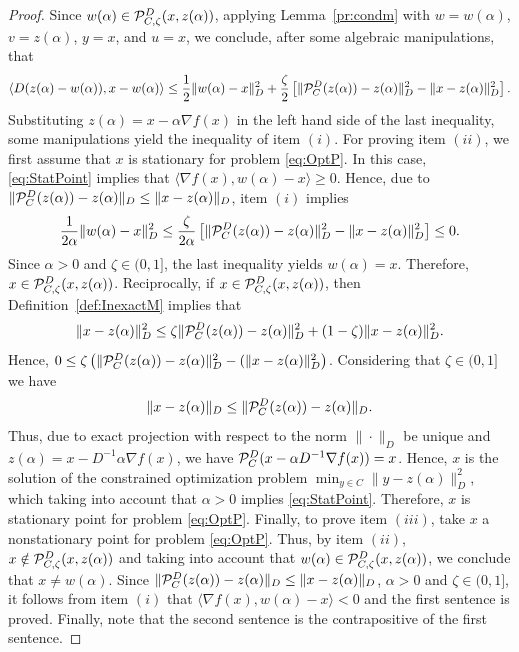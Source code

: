 \begin{proof}
	Since $w(\alpha) \in  {\cal P}_{C,\zeta}^{D}(x, z(\alpha))$, applying Lemma~\ref{pr:condm} with   $w=w(\alpha)$, $v=z(\alpha)$, $y=x$,  and $u=x$, we conclude,  after some algebraic manipulations,  that
	$$
		\left\langle D(z(\alpha)-w(\alpha)), x-w(\alpha) \right\rangle \leq 	\frac{1}{2} \|w(\alpha) -x\|_{D}^2 +   \frac{\zeta}{2} \left[\| {\cal P}_{C}^{D}(z(\alpha))-z(\alpha)\|_{D}^2 - \|x-z(\alpha)\|_{D}^2\right].
	$$
	Substituting  $z(\alpha) = x-\alpha \nabla f(x)$ in the left hand side of the last inequality,   some manipulations yield the inequality of item $(i)$.  For proving item $(ii)$, we first assume that $x$ is stationary for problem \eqref{eq:OptP}. In this case, \eqref{eq:StatPoint} implies that $\langle \nabla f(x), w(\alpha)-x \rangle \geq 0$. Hence,  due to $\|{\cal P}_{C}^{D}(z(\alpha))-z(\alpha)\|_{D}\leq  \|x-z(\alpha)\|_{D}$,   item $(i)$ implies
	$$
		\frac{1}{2\alpha} \|w(\alpha) -x\|_{D}^2 \leq    \frac{\zeta}{2\alpha} \left[\| {\cal P}_{C}^{D}(z(\alpha))-z(\alpha)\|_{D}^2 - \|x-z(\alpha)\|_{D}^2\right]\leq 0.
	$$
	Since $\alpha > 0$ and  $\zeta\in (0, 1]$, the last inequality  yields  $w(\alpha) = x$.  Therefore, $x \in {\cal P}_{C,\zeta}^{D}(x, z(\alpha))$. Reciprocally, if  $x \in {\cal P}_{C,\zeta}^{D}(x, z(\alpha))$, then Definition~\ref{def:InexactM} implies that
	$$
		\|x-z(\alpha)\|_{D}^2\leq \zeta \| {\cal P}_{C}^{D}(z(\alpha))-z(\alpha)\|_{D}^2+(1-\zeta)\|x-z(\alpha)\|_{D}^2.
	$$
	Hence, $0\leq \zeta\left( \| {\cal P}_{C}^{D}(z(\alpha))-z(\alpha)\|_{D}^2-(\|x-z(\alpha)\|_{D}^2\right)$. Considering that  $\zeta\in (0, 1]$ we have
	$$
		\|x-z(\alpha)\|_{D}\leq\| {\cal P}_{C}^{D}(z(\alpha))-z(\alpha)\|_{D}.
	$$
	Thus, due to  exact projection  with respect to the norm $\| \cdot \| _{D}$   be unique and $z(\alpha) = x-D^{-1} \alpha \nabla f(x)$,   we have    ${\cal P}_{C}^{D}( x-\alpha D^{-1} \nabla f(x))=x$. Hence, $x$ is the  solution of the constrained optimization problem $  \min _{y\in C}  \|y-z(\alpha)\| ^{2}_{D}$,
	which taking into account that  $\alpha > 0$ implies \eqref{eq:StatPoint}. Therefore, $x$ is stationary point for problem \eqref{eq:OptP}. Finally, to prove item $(iii)$, take $x$ a nonstationary point for problem \eqref{eq:OptP}. Thus, by item $(ii)$, $x \notin  {\cal P}_{C,\zeta}^{D}(x, z(\alpha))$ and taking into account that $w(\alpha) \in  {\cal P}_{C,\zeta}^{D}(x, z(\alpha))$, we conclude that $x \neq w(\alpha)$. Since $\|{\cal P}_{C}^{D}(z(\alpha))-z(\alpha)\|_{D}\leq  \|x-z(\alpha)\|_{D}$, $\alpha > 0$ and $\zeta\in (0, 1]$, it follows from item $(i)$ that $\Big\langle \nabla f(x), w(\alpha) - x \Big\rangle < 0$ and the first sentence is proved. Finally, note that the second sentence is the contrapositive of the first sentence.
\end{proof}

